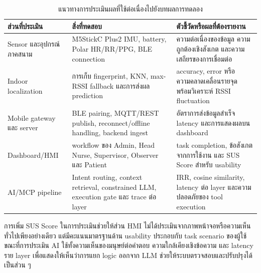 \begin{table}[H]
    \centering
    \caption{แนวทางการประเมินผลที่ใช้ต่อเนื่องไปยังบทผลการทดลอง}
    \label{tab:ch3_evaluation_plan}
    \small
    \renewcommand{\arraystretch}{1.22}
    \begin{tabular}{|L{3.4cm}|L{4.8cm}|L{4.5cm}|}
        \hline
        \textbf{ส่วนที่ประเมิน} & \textbf{สิ่งที่ทดสอบ} & \textbf{ตัวชี้วัดหรือผลที่ต้องรายงาน} \\ \hline
        Sensor และอุปกรณ์ภาคสนาม & M5StickC Plus2 IMU, battery, Polar HR/RR/PPG, BLE connection & ความต่อเนื่องของข้อมูล ความถูกต้องเชิงสังเกต และความเสถียรของการเชื่อมต่อ \\ \hline
        Indoor localization & การเก็บ fingerprint, KNN, max-RSSI fallback และการส่งผล prediction & accuracy, error หรือความคลาดเคลื่อนรายจุด พร้อมวิเคราะห์ RSSI fluctuation \\ \hline
        Mobile gateway และ server & BLE pairing, MQTT/REST publish, reconnect/offline handling, backend ingest & อัตราการส่งข้อมูลสำเร็จ latency และการแสดงผลบน dashboard \\ \hline
        Dashboard/HMI & workflow ของ Admin, Head Nurse, Supervisor, Observer และ Patient & task completion, ข้อสังเกตจากการใช้งาน และ SUS Score สำหรับ usability \\ \hline
        AI/MCP pipeline & Intent routing, context retrieval, constrained LLM, execution gate และ trace ต่อ layer & IRR, cosine similarity, latency ต่อ layer และความปลอดภัยของ tool execution \\ \hline
    \end{tabular}
\end{table}

การเพิ่ม SUS Score ในการประเมินช่วยให้ส่วน HMI ไม่ได้ประเมินจากภาพหน้าจอหรือความเห็นทั่วไปเพียงอย่างเดียว แต่มีคะแนนมาตรฐานด้าน usability ประกอบกับ task scenario ของผู้ใช้ ขณะที่การประเมิน AI ใช้ทั้งความเห็นของมนุษย์ต่อคำตอบ ความใกล้เคียงเชิงข้อความ และ latency ราย layer เพื่อแสดงให้เห็นว่าการแยก logic ออกจาก LLM ช่วยให้ระบบตรวจสอบและปรับปรุงได้เป็นส่วน ๆ
